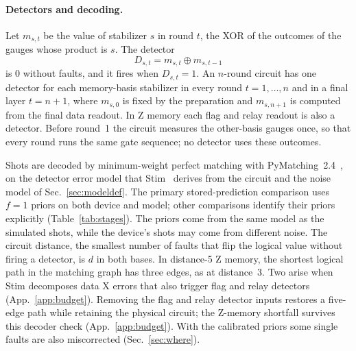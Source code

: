 \documentclass[aps,pra,reprint,nofootinbib,longbibliography,floatfix,showkeys]{revtex4-2}
\begin{document}
\paragraph*{Detectors and decoding.}
Let $m_{s,t}$ be the value of stabilizer $s$ in round $t$, the XOR of the outcomes of the gauges whose product is $s$.
The detector
\begin{equation}
  D_{s,t} = m_{s,t} \oplus m_{s,t-1}
  \label{eq:detector}
\end{equation}
is 0 without faults, and it fires when $D_{s,t}=1$.
An $n$-round circuit has one detector for each memory-basis stabilizer in every round $t = 1, \ldots, n$ and in a final layer $t = n+1$, where $m_{s,0}$ is fixed by the preparation and $m_{s,n+1}$ is computed from the final data readout.
In Z memory each flag and relay readout is also a detector.
Before round~1 the circuit measures the other-basis gauges once, so that every round runs the same gate sequence; no detector uses these outcomes.

Shots are decoded by minimum-weight perfect matching with PyMatching~2.4~\cite{higgott2025sparse}, on the detector error model that Stim~\cite{gidney2021stim,stim116} derives from the circuit and the noise model of Sec.~\ref{sec:modeldef}.
The primary stored-prediction comparison uses $f=1$ priors on both device and model; other comparisons identify their priors explicitly (Table~\ref{tab:stages}).
The priors come from the same model as the simulated shots, while the device's shots may come from different noise.
The circuit distance, the smallest number of faults that flip the logical value without firing a detector, is $d$ in both bases.
In distance-5 Z memory, the shortest logical path in the matching graph has three edges, as at distance~3.
Two arise when Stim decomposes data X errors that also trigger flag and relay detectors (App.~\ref{app:budget}).
Removing the flag and relay detector inputs restores a five-edge path while retaining the physical circuit; the Z-memory shortfall survives this decoder check (App.~\ref{app:budget}).
With the calibrated priors some single faults are also miscorrected (Sec.~\ref{sec:where}).
\end{document}
